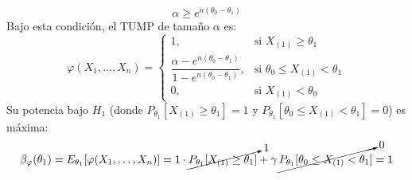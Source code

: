 \begin{ejercicio}
\begin{description}
\begin{itemize}
        \begin{equation*}
            \alpha \ge e^{n(\theta_0 - \theta_1)}
        \end{equation*}
        Bajo esta condición, el TUMP de tamaño $\alpha$ es:
        \begin{equation*}
            \varphi(X_1, \dots, X_n) =
            \begin{cases}
                1, & \text{si } X_{(1)} \ge \theta_1 \\
                \dfrac{\alpha - e^{n(\theta_0 - \theta_1)}}{1 - e^{n(\theta_0 - \theta_1)}}, & \text{si } \theta_0 \le X_{(1)} < \theta_1 \\
                0, & \text{si } X_{(1)} < \theta_0
            \end{cases}
        \end{equation*}
        Su potencia bajo $H_1$ (donde $P_{\theta_1}[X_{(1)} \ge \theta_1] = 1$ y $P_{\theta_1}[\theta_0 \le X_{(1)} < \theta_1] = 0$) es máxima:
        \begin{equation*}
            \beta_\varphi(\theta_1) = E_{\theta_1}[\varphi(X_1, \dots, X_n)] = 1 \cdot \cancelto{1}{P_{\theta_1}[X_{(1)} \ge \theta_1]} + \gamma \, \cancelto{0}{P_{\theta_1}[\theta_0 \le X_{(1)} < \theta_1]} = 1
        \end{equation*}


\end{itemize}
\end{description}
\end{ejercicio}
